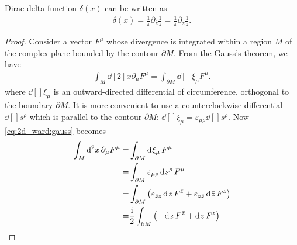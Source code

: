 \documentclass[10pt]{article}
\newcommand{\ii}{\mathrm{i}}
\begin{document}
\begin{claim}
    Dirac delta function $\delta(x)$ can be written as\snm
    \begin{align}
        \delta(x)=\frac{1}{\pi}\partial_{\bar{z}}\frac{1}{z}=\frac{1}{\pi}\partial_{z}\frac{1}{\bar{z}}.\label{eq:2d_ward:dirac_another}
    \end{align}
\end{claim}
\begin{proof}
    Consider a vector $F^\mu$ whose divergence is integrated within a region $M$ of the complex plane bounded by the contour $\partial M$.
    From the Gauss's theorem, we have
    \begin{align}
        \int_M\dd[2]{x}\partial_\mu F^\mu=\int_{\partial M}\dd[]{\xi_\mu} F^\mu.\label{eq:2d_ward:gauss}
    \end{align}
    where $\dd[]{\xi_\mu}$ is an outward-directed differential of circumference, orthogonal to the boundary $\partial M$.
    It is more convenient to use a counterclockwise differential $\dd[]{s^\rho}$ which is parallel to the contour $\partial M$: $\dd[]{\xi_\mu}=\varepsilon_{\mu\rho}\dd[]{s^\rho}$.
    Now \cref{eq:2d_ward:gauss} becomes
    \begin{align}
        \int_M\dd[2]{x}\partial_\mu F^\mu= & \int_{\partial M}\dd[]{\xi_\mu} F^\mu\notag                                                                             \\
        =                                  & \int_{\partial M}\varepsilon_{\mu\rho}\dd[]{s^\rho}F^\mu\notag                                                          \\
        =                                  & \int_{\partial M}\left(\varepsilon_{\bar{z}z}\dd[]{z}F^{\bar{z}}+\varepsilon_{z\bar{z}}\dd[]{\bar{z}}F^{z}\right)\notag \\
        =                                  & \frac{\ii}{2}\int_{\partial M}\left(-\dd[]{z}F^{\bar{z}}+\dd[]{\bar{z}}F^{z}\right)\label{eq:2dcft:another_gauss}
    \end{align}
    

\end{proof}
\end{document}
